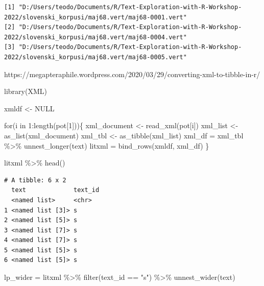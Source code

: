 \documentclass[
  letterpaper,
]{scrbook}
\newenvironment{Shaded}{\begin{snugshade}}{\end{snugshade}}
\newcommand{\CommentTok}[1]{\textcolor[rgb]{0.37,0.37,0.37}{#1}}
\newcommand{\ConstantTok}[1]{\textcolor[rgb]{0.56,0.35,0.01}{#1}}
\newcommand{\ControlFlowTok}[1]{\textcolor[rgb]{0.00,0.23,0.31}{#1}}
\newcommand{\DecValTok}[1]{\textcolor[rgb]{0.68,0.00,0.00}{#1}}
\newcommand{\FunctionTok}[1]{\textcolor[rgb]{0.28,0.35,0.67}{#1}}
\newcommand{\NormalTok}[1]{\textcolor[rgb]{0.00,0.23,0.31}{#1}}
\newcommand{\OtherTok}[1]{\textcolor[rgb]{0.00,0.23,0.31}{#1}}
\newcommand{\SpecialCharTok}[1]{\textcolor[rgb]{0.37,0.37,0.37}{#1}}
\newcommand{\StringTok}[1]{\textcolor[rgb]{0.13,0.47,0.30}{#1}}
\begin{document}
\begin{verbatim}
[1] "D:/Users/teodo/Documents/R/Text-Exploration-with-R-Workshop-2022/slovenski_korpusi/maj68.vert/maj68-0001.vert"
[2] "D:/Users/teodo/Documents/R/Text-Exploration-with-R-Workshop-2022/slovenski_korpusi/maj68.vert/maj68-0004.vert"
[3] "D:/Users/teodo/Documents/R/Text-Exploration-with-R-Workshop-2022/slovenski_korpusi/maj68.vert/maj68-0005.vert"
\end{verbatim}

https://megapteraphile.wordpress.com/2020/03/29/converting-xml-to-tibble-in-r/

\begin{Shaded}
\begin{Highlighting}[]
\FunctionTok{library}\NormalTok{(XML)}

\NormalTok{xmldf }\OtherTok{\textless{}{-}} \ConstantTok{NULL}

\ControlFlowTok{for}\NormalTok{(i }\ControlFlowTok{in} \DecValTok{1}\SpecialCharTok{:}\FunctionTok{length}\NormalTok{(pot[}\DecValTok{1}\NormalTok{]))\{}
\NormalTok{  xml\_document }\OtherTok{\textless{}{-}} \FunctionTok{read\_xml}\NormalTok{(pot[i])}
\NormalTok{  xml\_list }\OtherTok{\textless{}{-}} \FunctionTok{as\_list}\NormalTok{(xml\_document)}
\NormalTok{  xml\_tbl }\OtherTok{\textless{}{-}} \FunctionTok{as\_tibble}\NormalTok{(xml\_list)}
\NormalTok{  xml\_df }\OtherTok{=}\NormalTok{ xml\_tbl }\SpecialCharTok{\%\textgreater{}\%} 
    \FunctionTok{unnest\_longer}\NormalTok{(text)}
\NormalTok{  litxml }\OtherTok{=} \FunctionTok{bind\_rows}\NormalTok{(xmldf, xml\_df)}
\NormalTok{\}}

\NormalTok{litxml }\SpecialCharTok{\%\textgreater{}\%} \FunctionTok{head}\NormalTok{()}
\end{Highlighting}
\end{Shaded}

\begin{verbatim}
# A tibble: 6 x 2
  text             text_id
  <named list>     <chr>  
1 <named list [3]> s      
2 <named list [5]> s      
3 <named list [7]> s      
4 <named list [7]> s      
5 <named list [5]> s      
6 <named list [5]> s      
\end{verbatim}

\begin{Shaded}
\end{Shaded}

\begin{Shaded}
\begin{Highlighting}[]
\NormalTok{lp\_wider }\OtherTok{=}\NormalTok{ litxml }\SpecialCharTok{\%\textgreater{}\%}
  \FunctionTok{filter}\NormalTok{(text\_id }\SpecialCharTok{==} \StringTok{"s"}\NormalTok{) }\SpecialCharTok{\%\textgreater{}\%}
  \FunctionTok{unnest\_wider}\NormalTok{(text) }
\end{Highlighting}
\end{Shaded}
\end{document}
